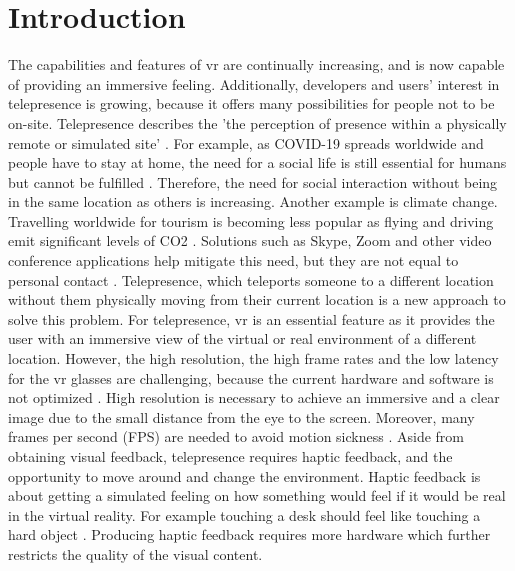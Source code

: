 \chapter{Introduction}\label{chapter:introduction}
The capabilities and features of \gls{vr} are continually increasing, and is now capable of providing an immersive feeling. Additionally, developers and users’ interest in telepresence is growing, because it offers many possibilities for people not to be on-site. Telepresence describes the 'the perception of presence within a physically remote or simulated site' \parencite {Draper1998}. For example, as COVID-19 spreads worldwide and people have to stay at home, the need for a social life is still essential for humans but cannot be fulfilled \parencite {Berg2020}. Therefore, the need for social interaction without being in the same location as others is increasing. Another example is climate change. Travelling worldwide for tourism is becoming less popular as flying and driving emit significant levels of CO2 \parencite {Zhang2019}. Solutions such as Skype, Zoom and other video conference applications help mitigate this need, but they are not equal to personal contact \parencite {Judge2010}. Telepresence, which teleports someone to a different location without them physically moving from their current location is a new approach to solve this problem. For telepresence, \gls{vr} is an essential feature as it provides the user with an immersive view of the virtual or real environment of a different location. However, the high resolution, the high frame rates and the low latency for the \gls{vr} glasses are challenging, because the current hardware and software is not optimized \parencite{VRReady}. High resolution is necessary to achieve an immersive and a clear image due to the small distance from the eye to the screen. Moreover, many frames per second (FPS) are needed to avoid motion sickness \parencite {Kim2018}. Aside from obtaining visual feedback, telepresence requires haptic feedback, and the opportunity to move around and change the environment. Haptic feedback is about getting a simulated feeling on how something would feel if it would be real in the virtual reality. For example touching a desk should feel like touching a hard object \parencite{Kuchenbecker2006}. Producing haptic feedback requires more hardware which further restricts the quality of the visual content.
\par
